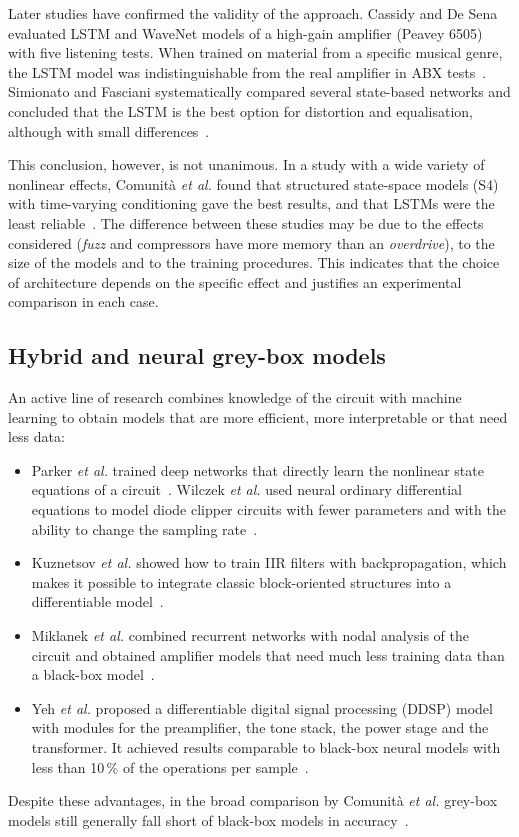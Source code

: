 \documentclass[ENG]{TFUOC}%
\begin{document}
Later studies have confirmed the validity of the approach. Cassidy and De Sena evaluated LSTM and WaveNet models of a high-gain amplifier (Peavey 6505) with five listening tests. When trained on material from a specific musical genre, the LSTM model was indistinguishable from the real amplifier in ABX tests~\cite{cassidy2023}. Simionato and Fasciani systematically compared several state-based networks and concluded that the LSTM is the best option for distortion and equalisation, although with small differences~\cite{simionato2025}.

This conclusion, however, is not unanimous. In a study with a wide variety of nonlinear effects, Comunità \emph{et al.} found that structured state-space models (S4) with time-varying conditioning gave the best results, and that LSTMs were the least reliable~\cite{comunita2025}. The difference between these studies may be due to the effects considered (\emph{fuzz} and compressors have more memory than an \emph{overdrive}), to the size of the models and to the training procedures. This indicates that the choice of architecture depends on the specific effect and justifies an experimental comparison in each case.

\subsection{Hybrid and neural grey-box models}

An active line of research combines knowledge of the circuit with machine learning to obtain models that are more efficient, more interpretable or that need less data:
\begin{itemize}[nosep]
    \item Parker \emph{et al.} trained deep networks that directly learn the nonlinear state equations of a circuit~\cite{parker2019}. Wilczek \emph{et al.} used neural ordinary differential equations to model diode clipper circuits with fewer parameters and with the ability to change the sampling rate~\cite{wilczek2022}.
    \item Kuznetsov \emph{et al.} showed how to train IIR filters with backpropagation, which makes it possible to integrate classic block-oriented structures into a differentiable model~\cite{kuznetsov2020}.
    \item Miklanek \emph{et al.} combined recurrent networks with nodal analysis of the circuit and obtained amplifier models that need much less training data than a black-box model~\cite{miklanek2023}.
    \item Yeh \emph{et al.} proposed a differentiable digital signal processing (DDSP) model with modules for the preamplifier, the tone stack, the power stage and the transformer. It achieved results comparable to black-box neural models with less than 10\,\% of the operations per sample~\cite{yeh2024ddsp}.
\end{itemize}
Despite these advantages, in the broad comparison by Comunità \emph{et al.} grey-box models still generally fall short of black-box models in accuracy~\cite{comunita2025}.
\end{document}
